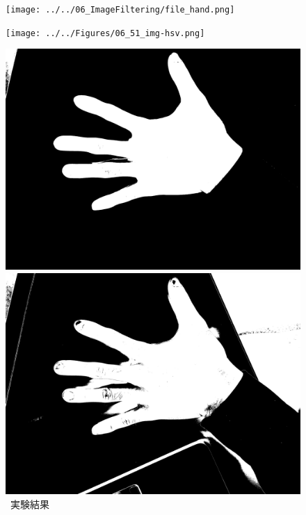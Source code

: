 \begin{figure}[H]
    \centering
    \begin{minipage}[b]{.23\textwidth}
        \centering
        \texttt{[image: ../../06\_ImageFiltering/file\_hand.png]}
    \end{minipage}
    \begin{minipage}[b]{.23\textwidth}
        \centering
        \texttt{[image: ../../Figures/06\_51\_img-hsv.png]}
    \end{minipage}
    \begin{minipage}[b]{.23\textwidth}
        \centering
        \includegraphics[keepaspectratio,width=\textwidth]{../../Figures/06_52_scd.png}
    \end{minipage}
    \begin{minipage}[b]{.23\textwidth}
        \includegraphics[keepaspectratio,width=\textwidth]{../../Figures/06_53_hand.png}
    \end{minipage}
    \caption{\kadaibe\ 実験結果}
\end{figure}
